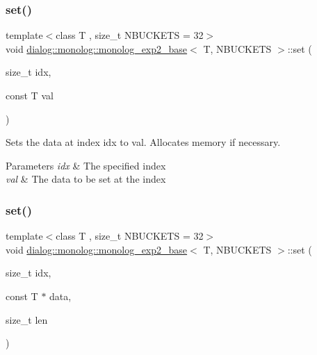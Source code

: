 \subsubsection{\texorpdfstring{set()}{set()}\hspace{0.1cm}{\footnotesize\ttfamily [1/2]}}
{\footnotesize\ttfamily template$<$class T , size\+\_\+t N\+B\+U\+C\+K\+E\+TS = 32$>$ \\
void \hyperlink{classdialog_1_1monolog_1_1monolog__exp2__base}{dialog\+::monolog\+::monolog\+\_\+exp2\+\_\+base}$<$ T, N\+B\+U\+C\+K\+E\+TS $>$\+::set (\begin{DoxyParamCaption}\item[{size\+\_\+t}]{idx,  }\item[{const T}]{val }\end{DoxyParamCaption})\hspace{0.3cm}{\ttfamily [inline]}}

Sets the data at index idx to val. Allocates memory if necessary. 
\begin{DoxyParams}{Parameters}
{\em idx} & The specified index \\
\hline
{\em val} & The data to be set at the index \\
\hline
\end{DoxyParams}
\mbox{\label{classdialog_1_1monolog_1_1monolog__exp2__base_a11fb0491dea6bd8e0877a47c3f22708a}} 
\subsubsection{\texorpdfstring{set()}{set()}\hspace{0.1cm}{\footnotesize\ttfamily [2/2]}}
{\footnotesize\ttfamily template$<$class T , size\+\_\+t N\+B\+U\+C\+K\+E\+TS = 32$>$ \\
void \hyperlink{classdialog_1_1monolog_1_1monolog__exp2__base}{dialog\+::monolog\+::monolog\+\_\+exp2\+\_\+base}$<$ T, N\+B\+U\+C\+K\+E\+TS $>$\+::set (\begin{DoxyParamCaption}\item[{size\+\_\+t}]{idx,  }\item[{const T $\ast$}]{data,  }\item[{size\+\_\+t}]{len }\end{DoxyParamCaption})\hspace{0.3cm}{\ttfamily [inline]}}

